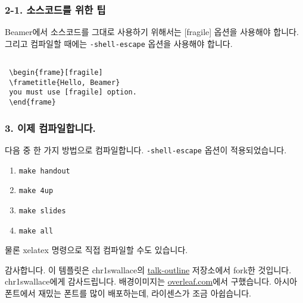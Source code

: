 \begin{frame}[fragile]
\frametitle{2-1. 소스코드를 위한 팁}
Beamer에서 소스코드를 그대로 사용하기 위해서는 [fragile] 옵션을 사용해야 합니다. 그리고 컴파일할 때에는 \lstinline|-shell-escape| 옵션을 사용해야 합니다.
\begin{lstlisting}

 \begin{frame}[fragile]
 \frametitle{Hello, Beamer}
 you must use [fragile] option.
 \end{frame}

\end{lstlisting}
\end{frame}


\begin{frame}[fragile]
\frametitle{3. 이제 컴파일합니다.}
다음 중 한 가지 방법으로 컴파일합니다. \lstinline|-shell-escape| 옵션이 적용되었습니다.
\begin{enumerate}
\item \lstinline|make handout|
\item \lstinline|make 4up|
\item \lstinline|make slides|
\item \lstinline|make all|

\end{enumerate}

물론 xelatex 명령으로 직접 컴파일할 수도 있습니다.
\end{frame}


\begin{frame}{감사합니다.}
이 템플릿은 chr1swallace의 \href{https://github.com/chr1swallace/talk-outline}{talk-outline} 저장소에서 fork한 것입니다. chr1swallace에게 감사드립니다. 배경이미지는 \href{https://www.overleaf.com/20113zpkgkf}{overleaf.com}에서 구했습니다. 아시아폰트에서 재밌는 폰트를 많이 배포하는데, 라이센스가 조금 아쉽습니다.
\vfill
\end{frame}



